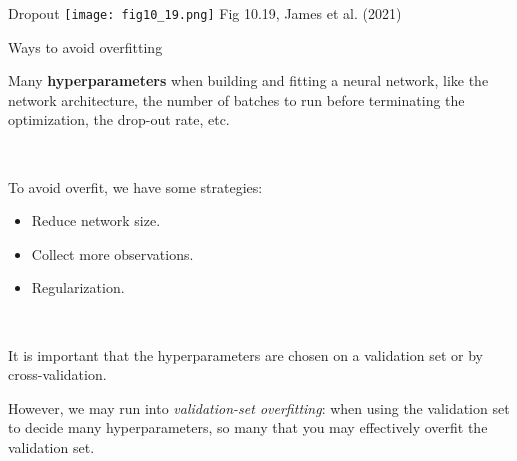 \documentclass[
  10pt,
  ignorenonframetext,
]{beamer}
\begin{document}
\begin{frame}
\begin{block}{Dropout}
\protect\hypertarget{dropout-1}{}
\texttt{[image: fig10\_19.png]} \scriptsize Fig 10.19, James et al.
(2021)
\end{block}
\end{frame}

\begin{frame}
\begin{block}{Ways to avoid overfitting}
\protect\hypertarget{ways-to-avoid-overfitting}{}
\(~\)

Many \textbf{hyperparameters} when building and fitting a neural
network, like the network architecture, the number of batches to run
before terminating the optimization, the drop-out rate, etc.

\(~\)

To avoid overfit, we have some strategies:

\vspace{2mm}

\begin{itemize}
\item
  Reduce network size. \vspace{2mm}
\item
  Collect more observations. \vspace{2mm}
\item
  Regularization.
\end{itemize}

\(~\)

It is important that the hyperparameters are chosen on a validation set
or by cross-validation.

\vspace{2mm}

However, we may run into \emph{validation-set overfitting}: when using
the validation set to decide many hyperparameters, so many that you may
effectively overfit the validation set.
\end{block}
\end{frame}
\end{document}
